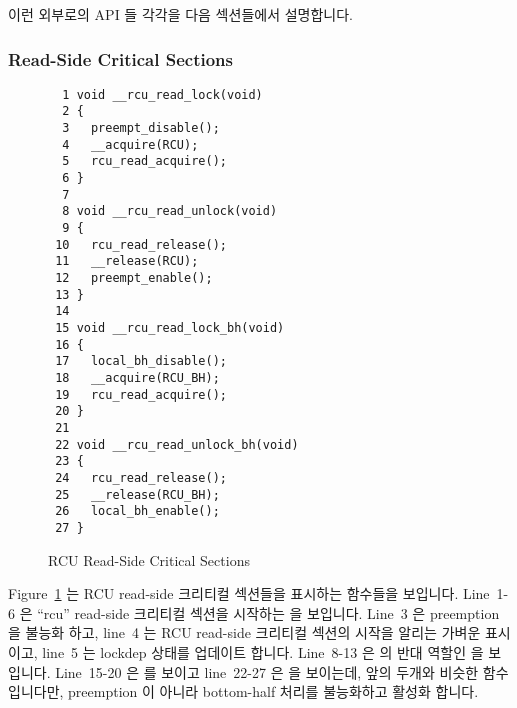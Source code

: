 이런 외부로의 API 들 각각을 다음 섹션들에서 설명합니다.
\iffalse

RCU's external interfaces include not just the standard RCU API,
but also the internal interfaces to the rest of the kernel that
are required for the RCU implementation itself.
The interfaces are
\co{rcu_read_lock()},
\co{rcu_read_unlock()},
\co{rcu_read_lock_bh()},
\co{rcu_read_unlock_bh()},
\co{call_rcu()} (which is a wrapper around
\co{__call_rcu()}),
\co{call_rcu_bh()} (ditto),
\co{rcu_check_callbacks()},
\co{rcu_process_callbacks()} (which is a wrapper around
\co{__rcu_process_callbacks()}),
\co{rcu_pending()} (which is a wrapper around
\co{__rcu_pending()}),
\co{rcu_needs_cpu()},
\co{rcu_cpu_notify()}, and
\co{__rcu_init()}.
Note that \co{synchronize_rcu()} and \co{rcu_barrier()} are
common to all RCU implementations, and are defined in terms of
\co{call_rcu()}.
Similarly, \co{rcu_barrier_bh()} is common to all RCU implementations
and is defined in terms of \co{call_rcu_bh()}.

These external APIs are each described in the following sections.
\fi

\subsubsection{Read-Side Critical Sections}
\label{app:rcuimpl:rcutreewt:Read-Side Critical Sections}

\begin{figure}[tbp]
{ \scriptsize
\begin{verbatim}
  1 void __rcu_read_lock(void)
  2 {
  3   preempt_disable();
  4   __acquire(RCU);
  5   rcu_read_acquire();
  6 }
  7
  8 void __rcu_read_unlock(void)
  9 {
 10   rcu_read_release();
 11   __release(RCU);
 12   preempt_enable();
 13 }
 14
 15 void __rcu_read_lock_bh(void)
 16 {
 17   local_bh_disable();
 18   __acquire(RCU_BH);
 19   rcu_read_acquire();
 20 }
 21
 22 void __rcu_read_unlock_bh(void)
 23 {
 24   rcu_read_release();
 25   __release(RCU_BH);
 26   local_bh_enable();
 27 }
\end{verbatim}
}
\caption{RCU Read-Side Critical Sections}
\label{fig:app:rcuimpl:rcutreewt:RCU Read-Side Critical Sections}
\end{figure}

Figure~\ref{fig:app:rcuimpl:rcutreewt:RCU Read-Side Critical Sections}
는 RCU read-side 크리티컬 섹션들을 표시하는 함수들을 보입니다.
Line~1-6 은 ``rcu'' read-side 크리티컬 섹션을 시작하는 
을 보입니다.
Line~3 은 preemption 을 불능화 하고,
line~4 는 RCU read-side 크리티컬 섹션의 시작을 알리는 가벼운 표시이고,
line~5 는 lockdep 상태를 업데이트 합니다.
Line~8-13 은  의 반대 역할인  을
보입니다.
Line~15-20 은  를 보이고 line~22-27 은
 을 보이는데, 앞의 두개와 비슷한 함수입니다만,
preemption 이 아니라 bottom-half 처리를 불능화하고 활성화 합니다.
\iffalse

